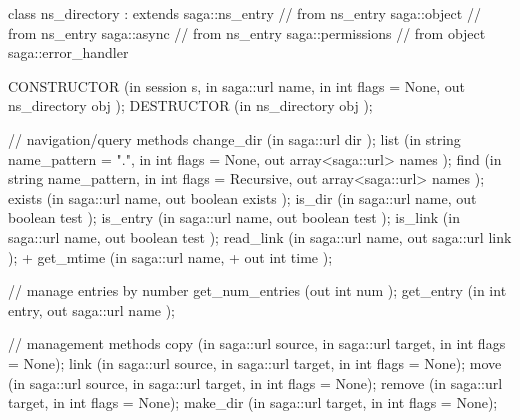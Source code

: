 \begin{myspec}
{ 
    class ns_directory : extends        saga::ns_entry
                         // from ns_entry  saga::object
                         // from ns_entry  saga::async
                         // from ns_entry  saga::permissions
                         // from object    saga::error_handler
    {
      CONSTRUCTOR        (in  session        s,
                          in  saga::url      name,
                          in  int            flags = None,
                          out ns_directory   obj     );
      DESTRUCTOR         (in  ns_directory   obj     );
 
      // navigation/query methods
      change_dir         (in  saga::url      dir     );
      list               (in  string         name_pattern = ".",
                          in  int            flags   = None, 
                          out array<saga::url> names   );
      find               (in  string         name_pattern,
                          in  int            flags = Recursive,
                          out array<saga::url> names   );
      exists             (in  saga::url      name,
                          out boolean        exists  );
      is_dir             (in  saga::url      name,
                          out boolean        test    );
      is_entry           (in  saga::url      name,
                          out boolean        test    );
      is_link            (in  saga::url      name,
                          out boolean        test    );
      read_link          (in  saga::url      name,
                          out saga::url      link    );
+     get_mtime          (in  saga::url      name,
+                         out int            time    );
 
      // manage entries by number
      get_num_entries    (out int            num     );
      get_entry          (in  int            entry,
                          out saga::url      name    );
 
      // management methods
      copy               (in  saga::url      source,
                          in  saga::url      target,
                          in  int            flags = None);
      link               (in  saga::url      source,
                          in  saga::url      target,
                          in  int            flags = None);
      move               (in  saga::url      source,
                          in  saga::url      target,
                          in  int            flags = None);
      remove             (in  saga::url      target,
                          in  int            flags = None);
      make_dir           (in  saga::url      target,
                          in  int            flags = None);
 
}}
\end{myspec}
